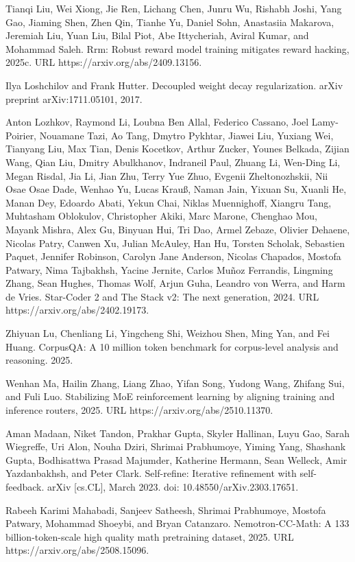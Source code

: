 \documentclass[
  10
]{article}
\begin{document}
Tianqi Liu, Wei Xiong, Jie Ren, Lichang Chen, Junru Wu, Rishabh Joshi,
Yang Gao, Jiaming Shen, Zhen Qin, Tianhe Yu, Daniel Sohn, Anastasiia
Makarova, Jeremiah Liu, Yuan Liu, Bilal Piot, Abe Ittycheriah, Aviral
Kumar, and Mohammad Saleh. Rrm: Robust reward model training mitigates
reward hacking, 2025c. URL https://arxiv.org/abs/2409.13156.

Ilya Loshchilov and Frank Hutter. Decoupled weight decay regularization.
arXiv preprint arXiv:1711.05101, 2017.

Anton Lozhkov, Raymond Li, Loubna Ben Allal, Federico Cassano, Joel
Lamy-Poirier, Nouamane Tazi, Ao Tang, Dmytro Pykhtar, Jiawei Liu,
Yuxiang Wei, Tianyang Liu, Max Tian, Denis Kocetkov, Arthur Zucker,
Younes Belkada, Zijian Wang, Qian Liu, Dmitry Abulkhanov, Indraneil
Paul, Zhuang Li, Wen-Ding Li, Megan Risdal, Jia Li, Jian Zhu, Terry Yue
Zhuo, Evgenii Zheltonozhskii, Nii Osae Osae Dade, Wenhao Yu, Lucas
Krauß, Naman Jain, Yixuan Su, Xuanli He, Manan Dey, Edoardo Abati, Yekun
Chai, Niklas Muennighoff, Xiangru Tang, Muhtasham Oblokulov, Christopher
Akiki, Marc Marone, Chenghao Mou, Mayank Mishra, Alex Gu, Binyuan Hui,
Tri Dao, Armel Zebaze, Olivier Dehaene, Nicolas Patry, Canwen Xu, Julian
McAuley, Han Hu, Torsten Scholak, Sebastien Paquet, Jennifer Robinson,
Carolyn Jane Anderson, Nicolas Chapados, Mostofa Patwary, Nima
Tajbakhsh, Yacine Jernite, Carlos Muñoz Ferrandis, Lingming Zhang, Sean
Hughes, Thomas Wolf, Arjun Guha, Leandro von Werra, and Harm de Vries.
Star-Coder 2 and The Stack v2: The next generation, 2024. URL
https://arxiv.org/abs/2402.19173.

Zhiyuan Lu, Chenliang Li, Yingcheng Shi, Weizhou Shen, Ming Yan, and Fei
Huang. CorpusQA: A 10 million token benchmark for corpus-level analysis
and reasoning. 2025.

Wenhan Ma, Hailin Zhang, Liang Zhao, Yifan Song, Yudong Wang, Zhifang
Sui, and Fuli Luo. Stabilizing MoE reinforcement learning by aligning
training and inference routers, 2025. URL https://arxiv.org/abs/2510.11370.

Aman Madaan, Niket Tandon, Prakhar Gupta, Skyler Hallinan, Luyu Gao,
Sarah Wiegreffe, Uri Alon, Nouha Dziri, Shrimai Prabhumoye, Yiming Yang,
Shashank Gupta, Bodhisattwa Prasad Majumder, Katherine Hermann, Sean
Welleck, Amir Yazdanbakhsh, and Peter Clark. Self-refine: Iterative
refinement with self-feedback. arXiv {[}cs.CL{]}, March 2023. doi:
10.48550/arXiv.2303.17651.

Rabeeh Karimi Mahabadi, Sanjeev Satheesh, Shrimai Prabhumoye, Mostofa
Patwary, Mohammad Shoeybi, and Bryan Catanzaro. Nemotron-CC-Math: A 133
billion-token-scale high quality math pretraining dataset, 2025. URL
https://arxiv.org/abs/2508.15096.
\end{document}

